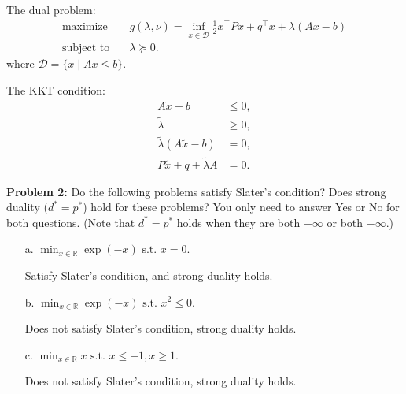 \documentclass{article}
\begin{document}
\begin{enumerate}
The dual problem:
$$
\begin{aligned}
\text{maximize}\quad &g(\lambda, \nu) = \inf_{x\in \mathcal{D}} \frac{1}{2}x^\top Px + q^\top x + \lambda (Ax-b)
\\
\text{subject to}\quad &\lambda\succeq 0.
\end{aligned}
$$
where $\mathcal{D} = \{x\mid Ax\le b\}$.

The KKT condition:
$$
\begin{aligned}
A\tilde{x} - b &\le 0, \\
\tilde\lambda &\ge 0,  \\
\tilde\lambda(A\tilde{x} - b) &= 0, \\
P\tilde{x}+q +\tilde{\lambda}A &= 0.
\end{aligned}
$$

\end{enumerate}

\noindent\textbf{Problem 2:} Do the following problems satisfy Slater's condition? Does strong duality ($d^*=p^*$) hold for these problems? You only need to answer Yes or No for both questions. (Note that $d^*=p^*$ holds when they are both $+\infty$ or both $-\infty$.)
\begin{enumerate}
	\item[a.]  $\min_{x\in\mathbb{R}} \exp(-x)\text{ s.t. }x=0$.

	Satisfy Slater's condition, and strong duality holds.

	\item[b.]  $\min_{x\in\mathbb{R}} \exp(-x)\text{ s.t. }x^2\leq0$.

	Does not satisfy Slater's condition, strong duality holds.

	\item[c.]  $\min_{x\in\mathbb{R}} x\text{ s.t. }x\leq-1, x\geq 1$.

	Does not satisfy Slater's condition, strong duality holds.

\end{enumerate}
\bigskip
\end{document}
